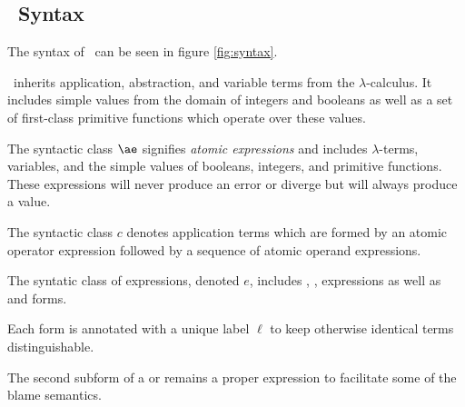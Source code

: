 \documentclass{sigplanconf}
\begin{document}
\subsection{\chapcalc\ Syntax}

The syntax of \chapcalc\ can be seen in figure \ref{fig:syntax}.

\chapcalc\ inherits application, abstraction, and variable terms from the $\lambda$-calculus.
It includes simple values from the domain of integers and booleans as well as a set of first-class primitive functions which operate over these values.

The syntactic class $\ae$ signifies \emph{atomic expressions} and includes $\lambda$-terms, variables, and the simple values of booleans, integers, and primitive functions. These expressions will never produce an error or diverge but will always produce a value.

The syntactic class $c$ denotes application terms which are formed by an atomic operator expression followed by a sequence of atomic operand expressions.

The syntatic class of expressions, denoted $e$, includes , ,  expressions as well as  and  forms.

Each  form is annotated with a unique label $\ell$ to keep otherwise identical terms distinguishable.

The second subform of a  or  remains a proper expression to facilitate some of the blame semantics.

\newcommand{\vx}[0]{\mathbf{x}}

\newcommand{\appe}[2]{(#1\,#2)}
\newcommand{\lame}[2]{(\lambda\,(#1)\,#2)}
\newcommand{\chae}[2]{(\mathit{chaperone\mhyphen operator}\,#1\,#2)^\ell}
\newcommand{\impe}[2]{(\mathit{impersonate\mhyphen operator}\,#1\,#2)}
\newcommand{\lete}[3]{(\mathbf{let}\,((#1)\,#2)\,#3)}
\newcommand{\letrece}[3]{(\mathbf{letrec}\,((#1)\,#2)\,#3)}
\newcommand{\ife}[3]{(\mathbf{if}\,#1\,#2\,#3)}

\newcommand{\ande}[2]{(\mathrm{and}\,#1\,#2)}
\newcommand{\ore}[2]{(\mathrm{or}\,#1\,#2)}
\end{document}
